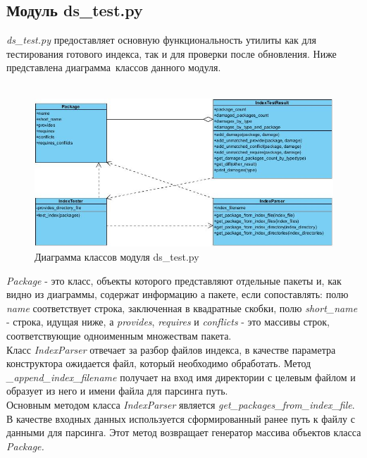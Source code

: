 \subsection{Модуль ds\_test.py}
\textit{ds\_test.py} предоставляет основную функциональность утилиты  как для тестирования
готового индекса, так и для проверки после обновления. Ниже представлена диаграмма~классов данного модуля.\\
\\
\begin{figure}[!ht]
\begin{center}
\includegraphics[scale=0.6, clip]{../resources/uml/ds_test_class_diagram.jpg}
\caption{Диаграмма классов модуля ds\_test.py}
\label{gr:dstestclassdiag}
\end{center}
\end{figure}

\textit{Package} - это класс, объекты которого представляют отдельные пакеты и, как видно из диаграммы,
содержат информацию а пакете, если сопоставлять: полю \textit{name} соответствует строка, заключенная
в квадратные скобки, полю \textit{short\_name} - строка, идущая ниже, а \textit{provides}, \textit{requires}
и \textit{conflicts} - это массивы строк, соответствующие одноименным множествам пакета. \\

Класс \textit{IndexParser} отвечает за разбор файлов индекса, в качестве параметра конструктора
ожидается файл, который необходимо обработать. Метод \textit{\_append\_index\_filename} получает на вход
имя директории с целевым файлом и образует из него и имени файла для парсинга
путь.\\
Основным методом класса \textit{IndexParser} является \textit{get\_packages\_from\_index\_file}.
В качестве входных данных используется сформированный ранее путь к файлу с данными
для парсинга. Этот метод возвращает генератор массива объектов класса \textit{Package.}\\

